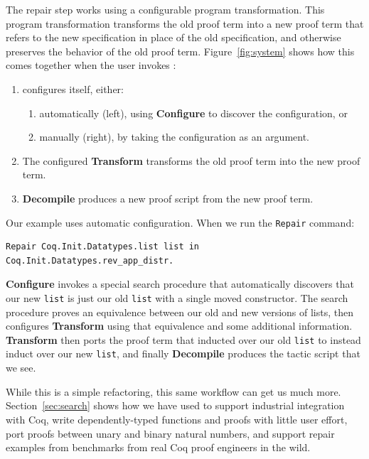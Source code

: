 The repair step works using a configurable program transformation.
This program transformation transforms the old proof term into a new proof term that refers to the new specification
in place of the old specification,
and otherwise preserves the behavior of the old proof term.
Figure~\ref{fig:system} shows how this comes together when the user invokes \toolname:

\begin{enumerate}
\item \toolname configures itself, either:
\begin{enumerate}
\item automatically (left), using \textbf{Configure} to discover the configuration, or
\item manually (right), by taking the configuration as an argument.
\end{enumerate}
\item The configured \textbf{Transform} transforms the old proof term into the new proof term.
\item \textbf{Decompile} produces a new proof script from the new proof term.
\end{enumerate}

Our example uses automatic configuration. When we run the \lstinline{Repair} command:

\begin{lstlisting}
Repair Coq.Init.Datatypes.list list in Coq.Init.Datatypes.rev_app_distr.
\end{lstlisting}
\textbf{Configure} invokes a special search procedure that automatically discovers that our new \lstinline{list}
is just our old \lstinline{list} with a single moved constructor.
The search procedure proves an equivalence between our old and new versions of lists,
then configures \textbf{Transform} using that equivalence and some additional information.
\textbf{Transform} then ports the proof term that inducted over our old \lstinline{list}
to instead induct over our new \lstinline{list}, and finally
\textbf{Decompile} produces the tactic script that we see.

While this is a simple refactoring, this same workflow can get us much more.
Section~\ref{sec:search} shows how we have used \toolname to support industrial integration with Coq,
write dependently-typed functions and proofs with little user effort,
port proofs between unary and binary natural numbers,
and support repair examples from benchmarks from real Coq proof engineers in the wild.



